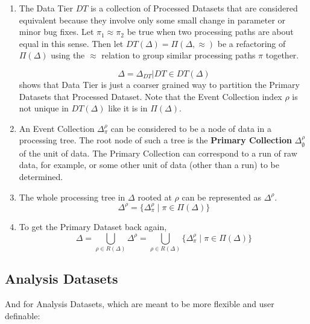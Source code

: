 \documentclass[pdftex]{cmspaper}
\begin{document}
{\begin{enumerate}
\item The Data Tier $DT$ is a collection of Processed Datasets that are 
      considered equivalent because they involve only some small change 
      in parameter or minor bug fixes.  Let $\pi_1 \approx \pi_2$ be 
      true when two processing paths are about equal in this sense. 
      Then let $DT(\Delta) = \Pi(\Delta,\approx)$ be a refactoring of 
      $\Pi(\Delta)$ using the $\approx$ relation to group similar 
      processing paths $\pi$ together.  

\begin{equation}
\Delta = {\Delta_{DT} | DT \in DT(\Delta)}
\end{equation}
shows that Data Tier is just a coarser grained way to partition the 
Primary Datasets that Processed Dataset.  Note that the Event Collection 
index $\rho$ is not unique in $DT(\Delta)$ like it is in $\Pi(\Delta)$.

\item An Event Collection $\Delta_{\pi}^{\rho}$ can be considered to be 
      a node of data in a processing tree. The root node of such a tree is 
      the {\bf Primary Collection} $\Delta_{\emptyset}^{\rho}$ of the 
      unit of data.  The Primary Collection can correspond to a run of 
      raw data, for example, or some other unit of data (other than a run) 
      to be determined.  

\item The whole processing tree in $\Delta$ rooted at $\rho$ can be 
      represented as $\Delta^{\rho}$. 
\begin{equation}
\Delta^{\rho} = \{ \Delta_{\pi}^{\rho} \mid \pi \in \Pi(\Delta) \}
\end{equation}

\item To get the Primary Dataset back again, 
\begin{equation}
\Delta = \bigcup_{\rho \in R(\Delta)} \Delta^{\rho} = \bigcup_{\rho \in R(\Delta)} \{ \Delta_{\pi}^{\rho} \mid \pi \in \Pi(\Delta) \} 
\end{equation}

\end{enumerate}


\subsection{Analysis Datasets}

And for Analysis Datasets, which are meant to be more flexible and user definable: 

}
\end{document}
